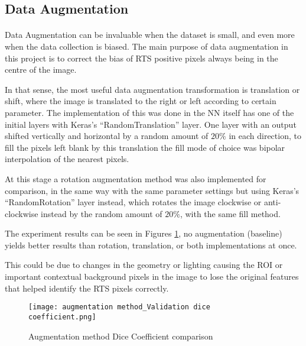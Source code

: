 \subsection{Data Augmentation}
\paragraph{}
Data Augmentation can be invaluable when the dataset is small, and even more when the data collection is biased. The main purpose of data augmentation in this project is to correct the bias of \gls{RTS} positive pixels always being in the centre of the image.

In that sense, the most useful data augmentation transformation is translation or shift, where the image is translated to the right or left according to certain parameter. The implementation of this was done in the \gls{NN} itself has one of the initial layers with Keras's “RandomTranslation” layer. One layer with an output shifted vertically and horizontal by a random amount of $20\%$ in each direction, to fill the pixels left blank by this translation the fill mode of choice was bipolar interpolation of the nearest pixels.

At this stage a rotation augmentation method was also implemented for comparison, in the same way with the same parameter settings but using Keras's “RandomRotation” layer instead, which rotates the image clockwise or anti-clockwise instead by the random amount of $20\%$, with the same fill method. 

The experiment results can be seen in Figures \ref{aug_dice}, no augmentation (baseline) yields better results than rotation, translation, or both implementations at once.

This could be due to changes in the geometry or lighting causing the \gls{ROI} or important contextual background pixels in the image to lose the original features that helped identify the \gls{RTS} pixels correctly.

\begin{figure}[hbt!]
    \centering
    \texttt{[image: augmentation method\_Validation dice coefficient.png]}
    \caption{Augmentation method Dice Coefficient comparison}
    \label{aug_dice}
\end{figure}
